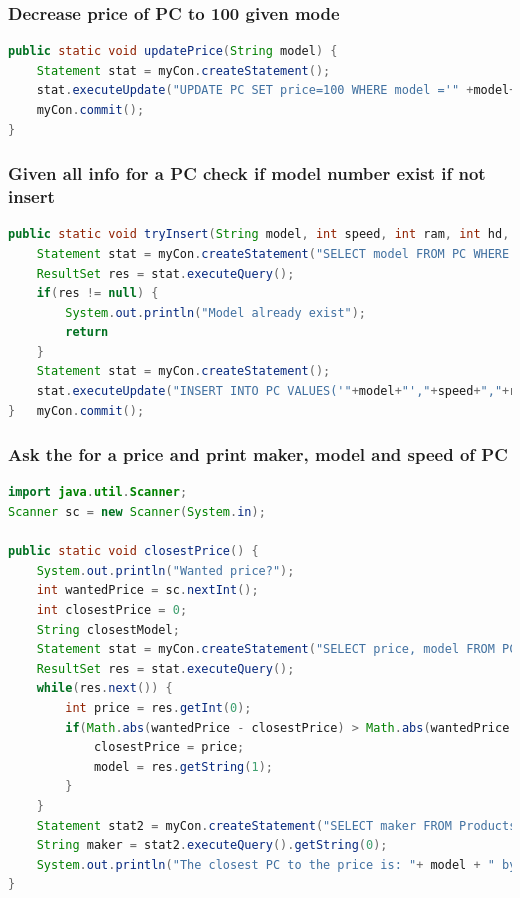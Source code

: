 \documentclass[12pt, a4paper]{article}
\begin{document}
			\subsubsection{Decrease price of PC to 100 given mode}
				\begin{lstlisting}[language=Java]
public static void updatePrice(String model) {
	Statement stat = myCon.createStatement();
	stat.executeUpdate("UPDATE PC SET price=100 WHERE model ='" +model+"'");
	myCon.commit();
}
				\end{lstlisting}
			\subsubsection{Given all info for a PC check if model number exist if not insert}
				\begin{lstlisting}[language=Java]
public static void tryInsert(String model, int speed, int ram, int hd, int price) {
	Statement stat = myCon.createStatement("SELECT model FROM PC WHERE model='"+model+"'");
	ResultSet res = stat.executeQuery();
	if(res != null) {
		System.out.println("Model already exist");
		return
	}
	Statement stat = myCon.createStatement();
	stat.executeUpdate("INSERT INTO PC VALUES('"+model+"',"+speed+","+ram+","+hd+","+price+")");
}	myCon.commit();
				\end{lstlisting}
			\subsubsection{Ask the for a price and print maker, model and speed of PC}
				\begin{lstlisting}[language=Java]
import java.util.Scanner;
Scanner sc = new Scanner(System.in);

public static void closestPrice() {
	System.out.println("Wanted price?");
	int wantedPrice = sc.nextInt();
	int closestPrice = 0;
	String closestModel;
	Statement stat = myCon.createStatement("SELECT price, model FROM PC");
	ResultSet res = stat.executeQuery();
	while(res.next()) {
		int price = res.getInt(0);
		if(Math.abs(wantedPrice - closestPrice) > Math.abs(wantedPrice - price)) {
			closestPrice = price;
			model = res.getString(1);
		}
	}
	Statement stat2 = myCon.createStatement("SELECT maker FROM Products WHERE model = '"+model+"'");
	String maker = stat2.executeQuery().getString(0);
	System.out.println("The closest PC to the price is: "+ model + " by " + maker + " for the price of " + closestPrice);
}
				\end{lstlisting}
\end{document}
